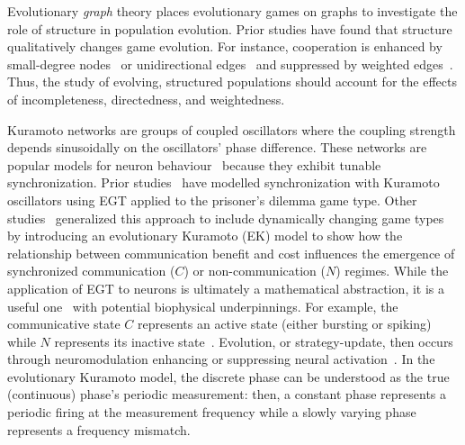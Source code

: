 \documentclass[10pt,letterpaper]{article}
\begin{document}
Evolutionary \emph{graph} theory places evolutionary games
on graphs to investigate the role of structure in population evolution.
Prior studies have found that structure
qualitatively changes game evolution.
For instance, cooperation is enhanced by
small-degree nodes~\cite{ohtsuki2006simple}
or unidirectional edges~\cite{su2022evolution}
and suppressed by weighted edges~\cite{bhaumik2024constant}.
Thus, the study of evolving, structured populations
should account for the effects of
incompleteness, directedness, and weightedness.

Kuramoto networks are groups of coupled oscillators
where the coupling strength depends sinusoidally
on the oscillators' phase difference.
These networks are popular
models for neuron behaviour~\cite{cabral2011role,deng2024chimeralike}
because they exhibit tunable synchronization.
Prior studies~\cite{antonioni2017coevolution}
have modelled synchronization with Kuramoto oscillators using EGT
applied to the prisoner's dilemma game type.
Other studies~\cite{tripp2022evolutionary}
generalized this approach to include dynamically changing game types
by introducing an evolutionary Kuramoto (EK) model
to show how the relationship between communication benefit and cost
influences the emergence of synchronized communication ($C$)
or non-communication ($N$) regimes.
While the application of EGT to neurons is ultimately a mathematical
abstraction,
it is a useful one~\cite{cohen2009evolutionary,madeo2017evolutionary,tripp2022evolutionary,poggio2025computational}
with potential biophysical
underpinnings.
For example,
the communicative state $C$ represents
an active state (either bursting or spiking)
while $N$ represents its inactive state~\cite{poggio2025computational}.
Evolution, or strategy-update,
then occurs through
neuromodulation enhancing or suppressing neural
activation~\cite{fernando2010neuronal}.
In the evolutionary Kuramoto model,
the discrete phase can be understood as
the true (continuous) phase's periodic measurement:
then, a constant phase represents a periodic firing at the measurement frequency
while a slowly varying phase represents a frequency mismatch.
\end{document}
